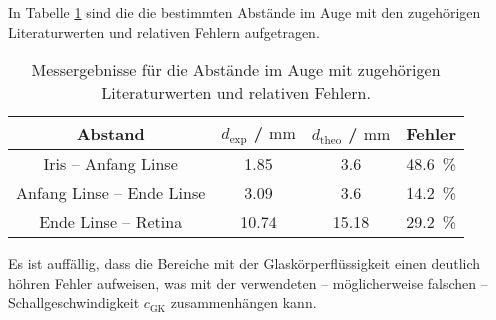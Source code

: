In Tabelle \ref{tab:augentheorie} sind die die bestimmten Abstände im Auge mit den zugehörigen
Literaturwerten und relativen Fehlern aufgetragen.
\begin{table}
	\centering
	\caption{Messergebnisse für die Abstände im Auge mit zugehörigen Literaturwerten \cite{auge} und relativen Fehlern.}
	\label{tab:augentheorie}
	\begin{tabular}{cccc}
	\toprule
		Abstand & $d_{\mathrm{exp}}$ / $\si{\milli\meter}$ & $d_{\mathrm{theo}}$ / $\si{\milli\meter}$ & Fehler \\
	\midrule
		Iris -- Anfang Linse & \num{1,85} & \num{3,6}& \SI{48,6}{\percent} \\
		Anfang Linse -- Ende Linse & \num{3,09} & \num{3,6}& \SI{14,2}{\percent} \\
		Ende Linse -- Retina & \num{10,74} & \num{15,18} & \SI{29,2}{\percent} \\
	\bottomrule
	\end{tabular}
\end{table}
Es ist auffällig, dass die Bereiche mit der Glaskörperflüssigkeit einen deutlich höhren
Fehler aufweisen, was mit der verwendeten -- möglicherweise falschen --
Schallgeschwindigkeit $c_{\mathrm{GK}}$
zusammenhängen kann.
\FloatBarrier
